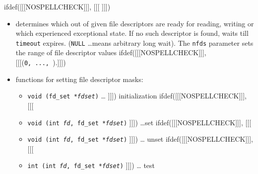 \begin{slide}
\setlength{\baselineskip}{0.9\baselineskip}
ifdef([[[NOSPELLCHECK]]], [[[
]]])
\begin{itemize}
\item determines which out of given file descriptors are ready for reading,
writing or which experienced exceptional state. If no such descriptor is
found, waits till \texttt{timeout} expires.
(\texttt{NULL} \dots means arbitrary long wait). The \texttt{nfds} parameter
sets the range of file descriptor values
ifdef([[[NOSPELLCHECK]]], [[[(\texttt{0,~...,~}).]]])
\item functions for setting file descriptor masks:
    \begin{itemize}
    ifdef([[[NOSPELLCHECK]]], [[[
    \item \texttt{void (fd\_set *\emph{fdset})} \dots{}
    ]]]) initialization
    ifdef([[[NOSPELLCHECK]]], [[[
    \item \texttt{void (int \emph{fd}, fd\_set *\emph{fdset})}
    ]]]) \dots set
    ifdef([[[NOSPELLCHECK]]], [[[
    \item \texttt{void (int \emph{fd}, fd\_set *\emph{fdset})}
    ]]]) \dots{} unset
    ifdef([[[NOSPELLCHECK]]], [[[
    \item \texttt{int (int \emph{fd}, fd\_set *\emph{fdset})}
    ]]]) \dots{} test
    \end{itemize}
\end{itemize}
\end{slide}

\label{SELECT}

